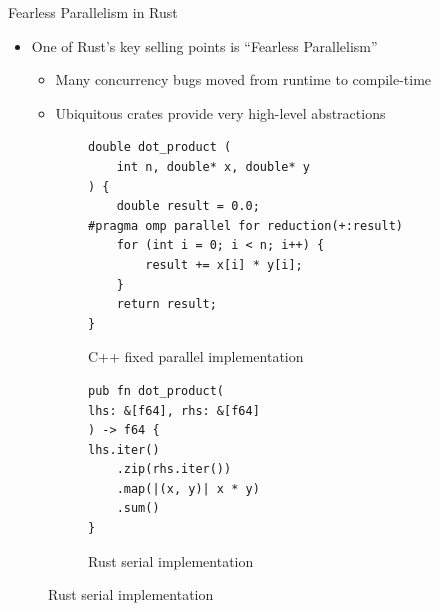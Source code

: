 \documentclass[10pt,aspectratio=169]{beamer}
\begin{document}
\begin{frame}{Fearless Parallelism in Rust}
    \begin{itemize}
        \item One of Rust's key selling points is ``Fearless Parallelism''
        \begin{itemize}
            \item Many concurrency bugs moved from runtime to compile-time
            \item Ubiquitous crates provide very high-level abstractions
        \end{itemize}
    \end{itemize}    
    \vspace*{0.15cm}

    \begin{figure}
        \begin{subfigure}[c]{.55\textwidth}\centering
            \begin{verbatim}
double dot_product (
    int n, double* x, double* y
) {
    double result = 0.0;
#pragma omp parallel for reduction(+:result)
    for (int i = 0; i < n; i++) {
        result += x[i] * y[i];
    }
    return result;
}
            \end{verbatim}
            \label{fig:cpp-ddot-openmp-reduction}
            \vspace*{-0.5cm}
            \caption{C++ fixed parallel implementation}
        \end{subfigure}%
        \begin{subfigure}[c]{.45\textwidth}\centering
            \begin{verbatim}
pub fn dot_product(
lhs: &[f64], rhs: &[f64]
) -> f64 {
lhs.iter()
    .zip(rhs.iter())
    .map(|(x, y)| x * y)
    .sum()
}
            \end{verbatim}
            \label{fig:rust-ddot-serial-3}
            \vspace*{1.15cm}
            \caption{Rust serial implementation}
        \end{subfigure}
    \end{figure}
\end{frame}
\end{document}
